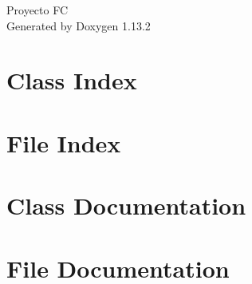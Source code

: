 \documentclass[twoside]{book}
\newcommand{\+}{\discretionary{\mbox{\scriptsize$\hookleftarrow$}}{}{}}
\newcommand{\clearemptydoublepage}{%
    \newpage{\pagestyle{empty}\cleardoublepage}%
  }
\begin{document}
  \raggedbottom
    \hypersetup{pageanchor=false,
                bookmarksnumbered=true,
                pdfencoding=unicode
               }
  \begin{titlepage}
  \vspace*{7cm}
  \begin{center}%
  {\Large Proyecto FC}\\
  \vspace*{1cm}
  {\large Generated by Doxygen 1.13.2}\\
  \end{center}
  \end{titlepage}
  \clearemptydoublepage
  \tableofcontents
  \clearemptydoublepage
  \hypersetup{pageanchor=true}
\chapter{Class Index}

\chapter{File Index}

\chapter{Class Documentation}


\chapter{File Documentation}


  \backmatter
  \newpage
  \clearemptydoublepage
  \printindex
\end{document}
